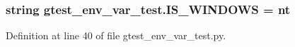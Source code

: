 \subsubsection[{\texorpdfstring{I\+S\+\_\+\+W\+I\+N\+D\+O\+WS}{IS_WINDOWS}}]{\setlength{\rightskip}{0pt plus 5cm}string gtest\+\_\+env\+\_\+var\+\_\+test.\+I\+S\+\_\+\+W\+I\+N\+D\+O\+WS = \textquotesingle{}nt\textquotesingle{}}\hypertarget{namespacegtest__env__var__test_af792d1403a09d46bffcd3466821cd0fb}{}\label{namespacegtest__env__var__test_af792d1403a09d46bffcd3466821cd0fb}


Definition at line 40 of file gtest\+\_\+env\+\_\+var\+\_\+test.\+py.

